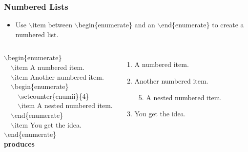 \documentclass [9pt] {beamer}
\begin{document}
\begin{frame}\frametitle{Numbered Lists}
\rm
\fontsize{9pt}{11pt}\selectfont
\begin{itemize}
\item Use \textcolor[rgb]{0.98,0.00,0.00}{$\backslash$item} between \textcolor[rgb]{0.98,0.00,0.00}{$\backslash$begin\{enumerate\}} and an \textcolor[rgb]{0.98,0.00,0.00}{$\backslash$end\{enumerate\}} to create a numbered list.\\[.20cm]
 \end{itemize}
 \begin{columns}[t]
\textcolor[rgb]{0.98,0.00,0.00}{$\backslash$begin\{enumerate\}\\
\ \ $\backslash$item A numbered item.\\
\ \ $\backslash$item Another numbered item.\\
\ \ $\backslash$begin\{enumerate\}\\
\ \ \ \ $\backslash$setcounter\{enumii\}\{4\}\\
\ \ \ \ $\backslash$item A nested numbered item.\\
\ \ $\backslash$end\{enumerate\}\\
\ \ $\backslash$item You get the idea.\\
$\backslash$end\{enumerate\}}\\[.20cm]
\textbf{produces}\\[.20cm]
%
\begin{enumerate}
\item A numbered item.
\item Another numbered item.
\begin{enumerate}
\setcounter{enumii}{4}
\item A nested numbered item.
\end{enumerate}
\item You get the idea.
\end{enumerate}
\end{columns}

\end{frame}
\end{document}
